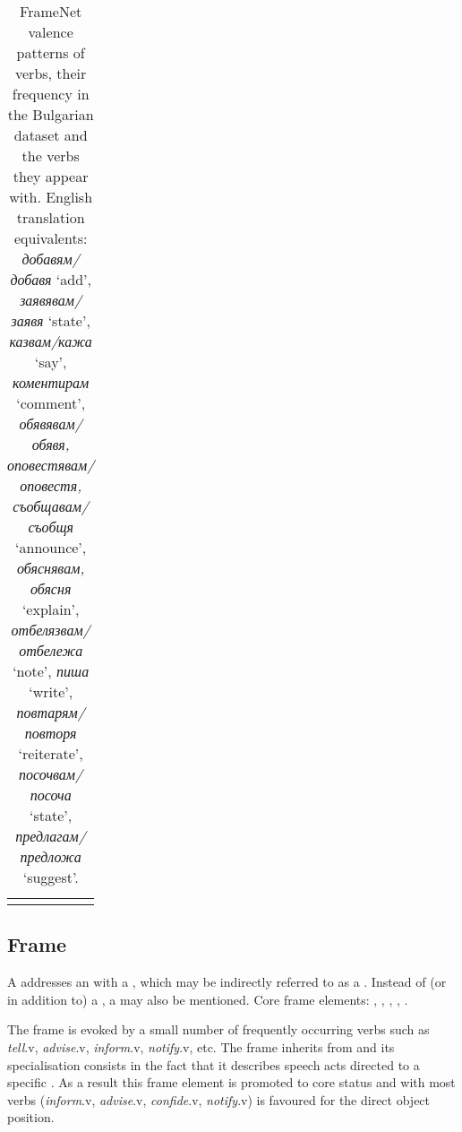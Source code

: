 \documentclass[output=paper,colorlinks,citecolor=brown]{langscibook}
\begin{document}
\begin{table}
\begin{tabularx}{\textwidth}{ lrQ }




\lspbottomrule
    \end{tabularx}
    \caption{FrameNet valence patterns of  verbs, their frequency in the Bulgarian dataset and the verbs they appear with.
     English translation equivalents: \textit{добавям\slash добавя} `add', \textit{заявявам\slash заявя} `state', \textit{казвам\slash кажа} `say', \textit{коментирам} `comment', \textit{обявявам\slash обявя, оповестявам\slash оповестя, съобщавам\slash съобщя} `announce', \textit{обяснявам, обясня} `explain', \textit{отбелязвам\slash отбележа} `note', \textit{пиша} `write', \textit{повтарям\slash повторя} `reiterate', \textit{посочвам\slash посоча} `state', \textit{предлагам\slash предложа} `suggest'.}
    \label{tbl:statement-valence-bg}
\end{table} 


\subsection{Frame }

\begin{description}[font=\normalfont]
\item[The definition of the \framename{Telling} frame is:] A  addresses an  with  a , which may be indirectly referred to as a . Instead of (or in addition to) a , a  may also be mentioned. Core frame elements: , , , , .
\end{description}

The frame  is evoked by a small number of frequently occurring verbs such as \textit{tell}.v, \textit{advise}.v, \textit{inform}.v, \textit{notify}.v, etc. The frame inherits from  and its specialisation consists in the fact that it describes speech acts directed to a specific . As a result this frame element is promoted to core status and with most verbs (\textit{inform}.v, \textit{advise}.v, \textit{confide}.v, \textit{notify}.v) is favoured for the direct object position. 
\end{document}
